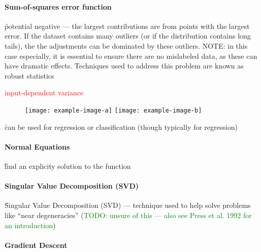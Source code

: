 \paragraph{Sum-of-squares error function}

\r{potential negative --- the largest contributions are from points with the largest error. If the dataset contains many outliers (or if the distribution contains long tails), the the adjustments can be dominated by these outliers. NOTE: in this case especially, it is essential to ensure there are no mislabeled data, as these can have dramatic effects. Techniques used to address this problem are known as robust statistics }

\textcolor{red}{input-dependent variance}

\begin{figure}[htp]
	\centering
	\texttt{[image: example-image-a]}\hfil
	\texttt{[image: example-image-b]}\hfil
	\caption{ }
	\label{fig:basics_error_fn_sumofsquares_outlier}
\end{figure}

\r{can be used for regression or classification (though typically for regression)}

 
\paragraph{Normal Equations}

\r{find an explicity solution to the function}

\paragraph{Singular Value Decomposition (SVD)}

\r{Singular Value Decomposition (SVD) --- technique used to help solve problems like ``near degeneracies'' (\textcolor{green}{TODO: unsure of this --- also see Press et al. 1992 for an introduction})}


\paragraph{Gradient Descent}

